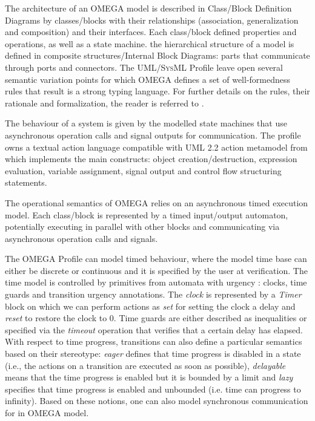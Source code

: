 \documentclass[a4paper,twoside]{article}
\def\sysml{\textsc{SysML}}
\def\uml{\textsc{UML}}
\begin{document}
The architecture of an OMEGA model is described in Class/Block Definition Diagrams by classes/blocks with their relationships (association, generalization and composition) and their interfaces. Each class/block defined properties and operations, as well as a state machine. the hierarchical structure of a model is defined in composite structures/Internal Block Diagrams: parts that communicate through ports and connectors. The \uml{}/\sysml{} Profile leave open several semantic variation points for which OMEGA defines a set of well-formedness rules that result is a strong typing language. For further details on the rules, their rationale and formalization, the reader is referred to \cite{test9}.


The behaviour of a system is given by the modelled state machines that use asynchronous operation calls and signal outputs for communication. The profile owns a textual action language compatible with \uml{} 2.2 action metamodel from which implements the main constructs: object creation/destruction, expression evaluation, variable assignment, signal output and control flow structuring statements.


The operational semantics of OMEGA relies on an asynchronous timed execution model. Each class/block is represented by a timed input/output automaton, potentially executing in parallel with other blocks and communicating via asynchronous operation calls and signals. 

The OMEGA Profile can model timed behaviour, where the model time base can either be discrete or continuous and it is specified by the user at verification. The time model is controlled by primitives from automata with urgency \cite{test10}: clocks, time guards and transition urgency annotations. The \textit{clock} is represented by a \textit{Timer} block on which we can perform actions as \textit{set} for setting the clock a delay and \textit{reset} to restore the clock to 0. Time guards are either described as inequalities or specified via the \textit{timeout} operation  that verifies that a certain delay has elapsed. With respect to time progress, transitions can also define a particular semantics based on their stereotype: \textit{eager} defines that time progress is disabled in a state (i.e., the actions on a transition are executed as soon as possible), \textit{delayable} means that the time progress is enabled but it is bounded by a limit and \textit{lazy} specifies that time progress is enabled and unbounded (i.e. time can progress to infinity). Based on these notions, one can also model synchronous communication for in OMEGA model.
\end{document}
